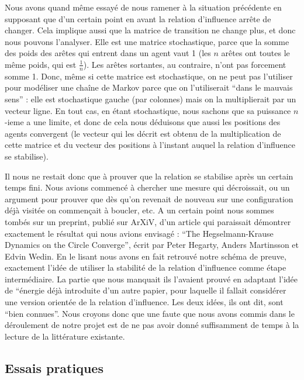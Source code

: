 \documentclass[a4paper,10pt]{article}
\begin{document}
Nous avons quand même essayé de nous ramener à la situation précédente en supposant que d'un certain point en avant la relation d'influence arrête de changer. Cela implique aussi que la matrice de transition ne change plus, et donc nous pouvons l'analyser. Elle est une matrice stochastique, parce que la somme des poids des arêtes qui entrent dans un agent vaut 1 (les $n$ arêtes ont toutes le même poids, qui est $\frac{1}{n}$). Les arêtes sortantes, au contraire, n'ont pas forcement somme 1. Donc, même si cette matrice est stochastique, on ne peut pas l'utiliser pour modéliser une chaîne de Markov parce que on l'utiliserait ``dans le mauvais sens'' : elle est stochastique gauche (par colonnes) mais on la multiplierait par un vecteur ligne. En tout cas, en étant stochastique, nous sachons que sa puissance $n$-ieme a une limite, et donc de cela nous déduisons que aussi les positions des agents convergent (le vecteur qui les décrit est obtenu de la multiplication de cette matrice et du vecteur des positions à l'instant auquel la relation d'influence se stabilise).

Il nous ne restait donc que à prouver que la relation se stabilise après un certain temps fini. Nous avions commencé à chercher une mesure qui décroissait, ou un argument pour prouver que dès qu'on revenait de nouveau sur une configuration déjà visitée on commençait à boucler, etc. A un certain point nous sommes tombés sur un preprint, publié sur ArXiV, d'un article qui paraissait démontrer exactement le résultat qui nous avions envisagé : ``The Hegselmann-Krause Dynamics on the Circle Converge'', écrit par Peter Hegarty, Anders Martinsson et Edvin Wedin. En le lisant nous avons en fait retrouvé notre schéma de preuve, exactement l’idée de utiliser la stabilité de la relation d'influence comme étape intermédiaire. La partie que nous manquait ils l'avaient prouvé en adaptant l’idée de ``\'energie déjà introduite d'un autre papier, pour laquelle il fallait considérer une version orientée de la relation d'influence. Les deux idées, ils ont dit, sont ``bien connues''. Nous croyons donc que une faute que nous avons commis dans le déroulement de notre projet est de ne pas avoir donné suffisamment de temps à la lecture de la littérature existante.

\subsection{Essais pratiques}
\end{document}
